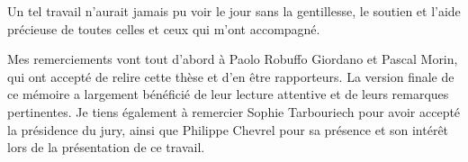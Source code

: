 








Un tel travail n’aurait jamais pu voir le jour sans la gentillesse, le soutien et l’aide précieuse de toutes celles et ceux qui m’ont accompagné.

Mes remerciements vont tout d’abord à Paolo Robuffo Giordano et Pascal Morin, qui ont accepté de relire cette thèse et d’en être rapporteurs. La version finale de ce mémoire a largement bénéficié de leur lecture attentive et de leurs remarques pertinentes. Je tiens également à remercier Sophie Tarbouriech pour avoir accepté la présidence du jury, ainsi que Philippe Chevrel pour sa présence et son intérêt lors de la présentation de ce travail.

